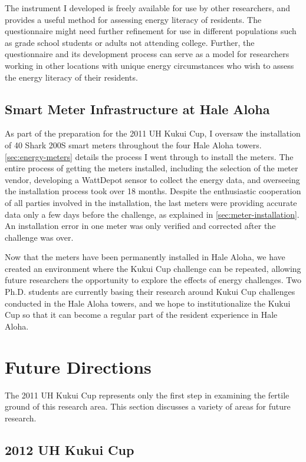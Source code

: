 The instrument I developed is freely available for use by other researchers, and provides a useful method for assessing energy literacy of \Hawaii residents. The questionnaire might need further refinement for use in different populations such as grade school students or adults not attending college. Further, the questionnaire and its development process can serve as a model for researchers working in other locations with unique energy circumstances who wish to assess the energy literacy of their residents.


\subsection{Smart Meter Infrastructure at Hale Aloha}

As part of the preparation for the 2011 UH Kukui Cup, I oversaw the installation of 40 Shark 200S smart meters throughout the four Hale Aloha towers. \autoref{sec:energy-meters} details the process I went through to install the meters. The entire process of getting the meters installed, including the selection of the meter vendor, developing a WattDepot sensor to collect the energy data, and overseeing the installation process took over 18 months. Despite the enthusiastic cooperation of all parties involved in the installation, the last meters were providing accurate data only a few days before the challenge, as explained in \autoref{sec:meter-installation}. An installation error in one meter was only verified and corrected after the challenge was over.

Now that the meters have been permanently installed in Hale Aloha, we have created an environment where the Kukui Cup challenge can be repeated, allowing future researchers the opportunity to explore the effects of energy challenges. Two Ph.D. students are currently basing their research around Kukui Cup challenges conducted in the Hale Aloha towers, and we hope to institutionalize the Kukui Cup so that it can become a regular part of the resident experience in Hale Aloha.


\section{Future Directions}

The 2011 UH Kukui Cup represents only the first step in examining the fertile ground of this research area. This section discusses a variety of areas for future research.

\subsection{2012 UH Kukui Cup}
\label{sec:2012-kukui-cup}

